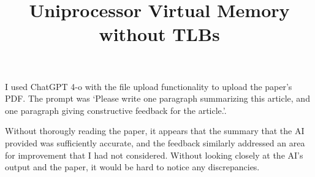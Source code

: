 \documentclass{article}
\title{Uniprocessor Virtual Memory without TLBs}
\begin{document}
\maketitle

I used ChatGPT 4-o with the file upload functionality to upload the paper's PDF.
The prompt was `Please write one paragraph summarizing this article, and one
paragraph giving constructive feedback for the article.'.

Without thorougly reading the paper, it appears that the summary that the AI provided
was sufficiently accurate, and the feedback similarly addressed an area for improvement
that I had not considered. Without looking closely at the AI's output and the paper,
it would be hard to notice any discrepancies.
\end{document}
